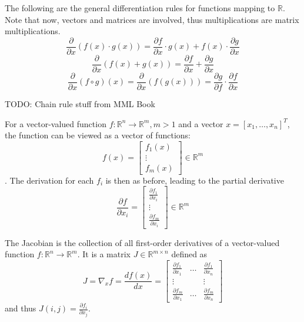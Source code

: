The following are the general differentiation rules for functions mapping to $\mathbb{R}$.
Note that now, vectors and matrices are involved, thus multiplications are matrix multiplications.
\begin{equation*}
    \frac{\partial}{\partial x} (f(x) \cdot g(x)) 
    = \frac{\partial f}{\partial x} \cdot g(x) + f(x) \cdot \frac{\partial g}{\partial x}
\end{equation*}
\begin{equation*}
    \frac{\partial}{\partial x} (f(x) + g(x)) 
    = \frac{\partial f}{\partial x} + \frac{\partial g}{\partial x}
\end{equation*}
\begin{equation*}
    \frac{\partial}{\partial x} (f \circ g)(x) 
    = \frac{\partial}{\partial x} (f(g(x)))
    = \frac{\partial g}{\partial f} \cdot \frac{\partial f}{\partial x}
\end{equation*}

TODO: Chain rule stuff from MML Book

For a vector-valued function $f : \mathbb{R}^n \to \mathbb{R}^m, m > 1$
and a vector $x = [x_1, \dotsc, x_n]^T$,
the function can be viewed as a vector of functions:
\begin{equation*}
    f(x) = 
    \begin{bmatrix}
    f_1(x) \\
    \vdots \\
    f_m(x)
    \end{bmatrix}
    \in \mathbb{R}^m
\end{equation*}.
The derivation for each $f_i$ is then as before, leading to the partial derivative
\begin{equation*}
    \frac{\partial f}{\partial x_i} =
    \begin{bmatrix}
    \frac{\partial f_1}{\partial x_i} \\
    \vdots \\
    \frac{\partial f_m}{\partial x_i}
    \end{bmatrix}
    \in \mathbb{R}^m
\end{equation*}

The Jacobian is the collection of all first-order derivatives of a vector-valued function
$f : \mathbb{R}^n \to \mathbb{R}^m$.
It is a matrix $J \in \mathbb{R}^{m \times n}$ defined as
\begin{equation*}
    J = \nabla_x f = \frac{d f(x)}{d x} =
    \begin{bmatrix}
    \frac{\partial f_1}{\partial x_1} & \dots & \frac{\partial f_1}{\partial x_n} \\
    \vdots & & \vdots \\
    \frac{\partial f_m}{\partial x_1} & \dots & \frac{\partial f_m}{\partial x_n}
    \end{bmatrix}
\end{equation*}
and thus $J(i, j) = \frac{\partial f_i}{\partial x_j}$.

